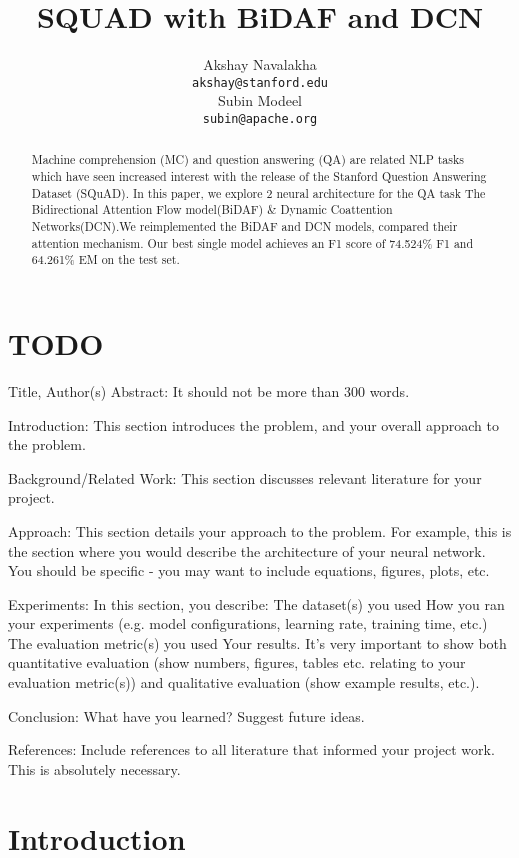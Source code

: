 \documentclass{article} %
\title{SQUAD with BiDAF and DCN}
\author{
Akshay Navalakha \\
\texttt{akshay@stanford.edu} \\
\And
Subin Modeel \\
\texttt{subin@apache.org} \\
}
\begin{document}
\maketitle

\begin{abstract}
Machine comprehension (MC) and question answering (QA) are related NLP tasks which have seen increased interest with the release of the Stanford Question Answering Dataset (SQuAD). In this paper, we explore 2 neural architecture for the QA task The Bidirectional Attention Flow
model(BiDAF) \& Dynamic Coattention Networks(DCN).We reimplemented the BiDAF and DCN models, compared their attention mechanism. Our best single model achieves an F1 score of  74.524\% F1 and 64.261\% EM on the test set.
\end{abstract}


\section{TODO}
    Title, Author(s)
    Abstract: It should not be more than 300 words.
    
    Introduction: This section introduces the problem, and your overall approach to the problem.
    
    Background/Related Work: This section discusses relevant literature for your project.
    
    Approach: This section details your approach to the problem. For example, this is the section where you would describe the architecture of your neural network. You should be specific - you may want to include equations, figures, plots, etc.
    
    Experiments: In this section, you describe:
        The dataset(s) you used
        How you ran your experiments (e.g. model configurations, learning rate, training time, etc.)
        The evaluation metric(s) you used
        Your results. It's very important to show both quantitative evaluation (show numbers, figures, tables etc. relating to your evaluation metric(s)) and qualitative evaluation (show example results, etc.). 
        
    Conclusion: What have you learned? Suggest future ideas.
    
    References: Include references to all literature that informed your project work. This is absolutely necessary.


\section{Introduction}
\end{document}
